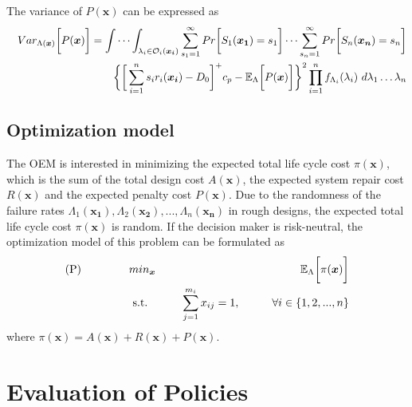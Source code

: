\documentclass[preprint,12pt]{elsarticle}
\begin{document}
The variance of $P(\boldsymbol{x})$ can be expressed as
\begin{eqnarray}
&&Var_{\Lambda(\boldsymbol{x})} \bigg[ P(\boldsymbol{x}) \bigg]=
\idotsint_{\lambda_{i} \in \mathcal{O}_{i}(\boldsymbol{x_{i}})} \sum_{s_{1}=1}^{\infty}{ Pr\bigg[S_{1}(\boldsymbol{x_{1}})=s_{1}\bigg]}\dots\sum_{s_{n}=1} ^{\infty}{Pr\bigg[S_{n}(\boldsymbol{x_{n}})=s_{n}\bigg]}\nonumber\\
&&\bigg\{\bigg[\sum_{i=1}^{n}{s_{i}r_{i}(\boldsymbol{x_{i}})}-D_{0}\bigg]^{+}c_{p} -\mathbb{E}_{\Lambda} \bigg[ P(\boldsymbol{x}) \bigg]\bigg\}^{2} \prod_{i=1}^{n} f_{\Lambda_{i}}(\lambda_{i}) \ d\lambda_{1}\dots\lambda_{n}
\end{eqnarray}

\subsection{Optimization model}
The OEM is interested in minimizing the expected total life cycle cost $\pi(\boldsymbol{x})$, which is the sum of the total design cost $A(\boldsymbol{x})$, the expected system repair cost $R(\boldsymbol{x})$ and the expected penalty cost $P(\boldsymbol{x})$. Due to the randomness of the failure rates $\Lambda_{1}(\boldsymbol{x_{1}}),\Lambda_{2}(\boldsymbol{x_{2}}),...,\Lambda_{n}(\boldsymbol{x_{n}})$ in rough designs, the expected total life cycle cost $\pi(\boldsymbol{x})$ is random. If the decision maker is risk-neutral, the optimization model of this problem can be formulated as
\begin{eqnarray}
\text{(P)} \hspace{15mm} & min_{\boldsymbol{x}} & \hspace{10mm} \mathbb{E}_{\Lambda} \bigg[ \pi(\boldsymbol{x})\bigg] \nonumber\\
& \text{ s.t. }&  \hspace{5mm} \sum_{j=1}^{m_i}{x_{ij}}=1, \hspace{10mm} \forall i \in \{1,2,...,n\} \nonumber
\end{eqnarray}
where $\pi(\boldsymbol{x})=A(\boldsymbol{x})+R(\boldsymbol{x})+P(\boldsymbol{x})$.

\section{Evaluation of Policies}
\end{document}
